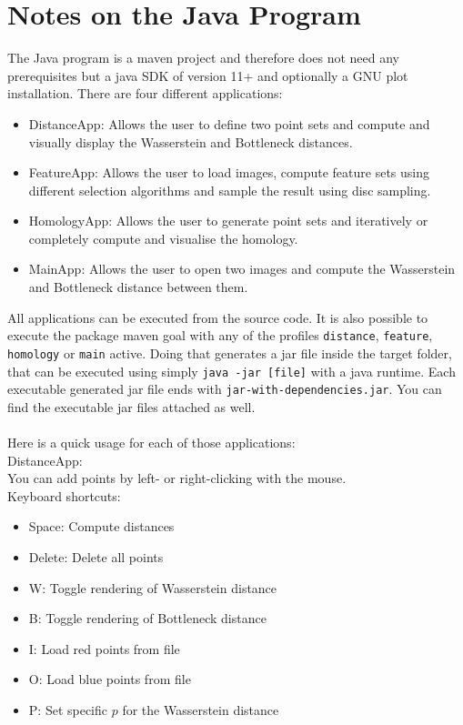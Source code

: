 \documentclass[11pt, a4paper, UKenglish]{article}
\begin{document}
    \section*{Notes on the Java Program}
    The Java program is a maven project and therefore does not need any prerequisites but a java SDK of version 11+ and optionally a GNU plot installation.
    There are four different applications:
    \begin{itemize}
        \item DistanceApp: Allows the user to define two point sets and compute and visually display the Wasserstein and Bottleneck distances.
        \item FeatureApp: Allows the user to load images, compute feature sets using different selection algorithms and sample the result using disc sampling.
        \item HomologyApp: Allows the user to generate point sets and iteratively or completely compute and visualise the homology.
        \item MainApp: Allows the user to open two images and compute the Wasserstein and Bottleneck distance between them.
    \end{itemize}
    All applications can be executed from the source code.
    It is also possible to execute the package maven goal with any of the profiles \texttt{distance}, \texttt{feature}, \texttt{homology} or \texttt{main} active.
    Doing that generates a jar file inside the target folder, that can be executed using simply \texttt{java -jar [file]} with a java runtime.
    Each executable generated jar file ends with \texttt{jar-with-dependencies.jar}.
    You can find the executable jar files attached as well.\\\\
    Here is a quick usage for each of those applications:\\
    DistanceApp:\\
    You can add points by left- or right-clicking with the mouse.\\
    Keyboard shortcuts:
    \begin{itemize}
    	\itemsep0em 
        \item Space: Compute distances
        \item Delete: Delete all points
        \item W: Toggle rendering of Wasserstein distance
        \item B: Toggle rendering of Bottleneck distance
        \item I: Load red points from file
        \item O: Load blue points from file
        \item P: Set specific $p$ for the Wasserstein distance
    \end{itemize}
\end{document}
